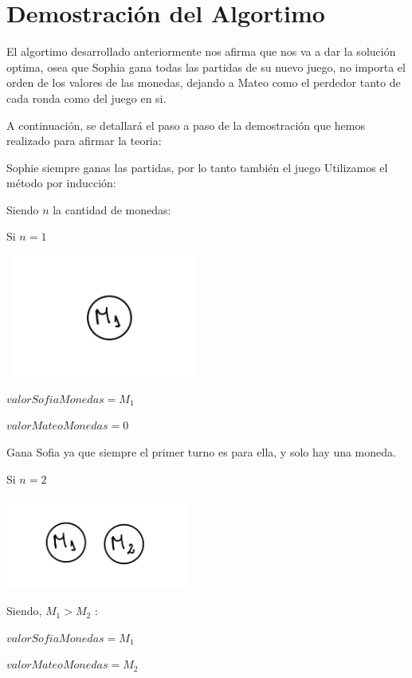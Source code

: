 \section{Demostración del Algortimo}

El algortimo desarrollado anteriormente nos afirma que nos va a dar la solución optima,
osea que Sophia gana todas las partidas de su nuevo juego, no importa el orden de los valores
de las monedas, dejando a Mateo como el perdedor tanto de cada ronda como del juego en si.

\vskip0.5cm

A continuación, se detallará el paso a paso de la demostración que hemos realizado para afirmar la teoria:

\vskip0.5cm

{\large{Sophie siempre ganas las partidas, por lo tanto también el juego}} 
\vskip0.5cm
Utilizamos el método por inducción:
\vskip0.5cm

Siendo $n$ la cantidad de monedas:
\vskip0.5cm

Si $n=1$ 

\includegraphics[width=6.5cm, height=4cm]{images/IMG_1625.jpg}


$valorSofiaMonedas=M_{1}$

$valorMateoMonedas=0$

Gana Sofia ya que siempre el primer turno es para ella, y solo hay una moneda.

\vskip1cm

Si $n=2$

\includegraphics[width=6cm, height=3cm]{images/IMG_1626.jpg}

Siendo, $M_{1}>M_{2}$ : 


$valorSofiaMonedas=M_{1}$

$valorMateoMonedas=M_{2}$

